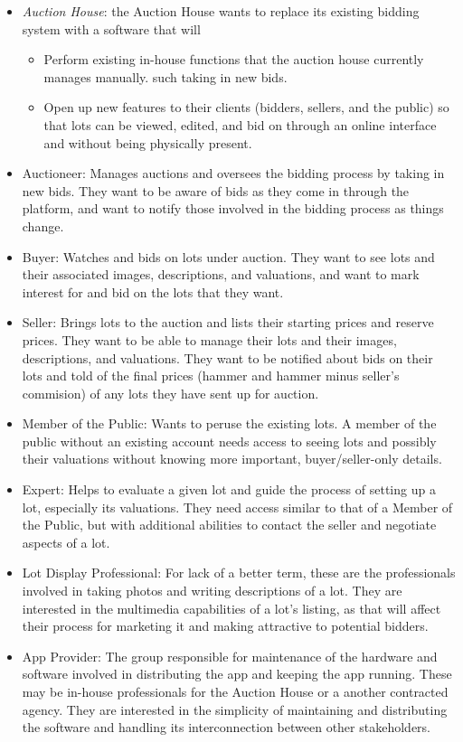 \documentclass{article}
\begin{document}
\begin{itemize}
\item {\it Auction House}: the Auction House wants to replace its existing bidding system with a software that will
    \begin{itemize}
    \item Perform existing in-house functions that the auction house currently manages manually. such taking in new bids.
    \item Open up new features to their clients (bidders, sellers, and the public) so that lots can be viewed, edited, and bid on through an online interface and without being physically present.
    \end{itemize}
\item Auctioneer: Manages auctions and oversees the bidding process by taking in new bids. They want to be aware of bids as they come in through the platform, and want to notify those involved in the bidding process as things change.
\item Buyer: Watches and bids on lots under auction. They want to see lots and their associated images, descriptions, and valuations, and want to mark interest for and bid on the lots that they want.
\item Seller: Brings lots to the auction and lists their starting prices and reserve prices. They want to be able to manage their lots and their images, descriptions, and valuations. They want to be notified about bids on their lots and told of the final prices (hammer and hammer minus seller's commision) of any lots they have sent up for auction.
\item Member of the Public: Wants to peruse the existing lots. A member of the public without an existing account needs access to seeing lots and possibly their valuations without knowing more important, buyer/seller-only details.
\item Expert: Helps to evaluate a given lot and guide the process of setting up a lot, especially its valuations. They need access similar to that of a Member of the Public, but with additional abilities to contact the seller and negotiate aspects of a lot.
\item Lot Display Professional: For lack of a better term, these are the professionals involved in taking photos and writing descriptions of a lot. They are interested in the multimedia capabilities of a lot's listing, as that will affect their process for marketing it and making attractive to potential bidders.
\item App Provider: The group responsible for maintenance of the hardware and software involved in distributing the app and keeping the app running. These may be in-house professionals for the Auction House or a another contracted agency. They are interested in the simplicity of maintaining and distributing the software and handling its interconnection between other stakeholders.
\end{itemize}
\end{document}
